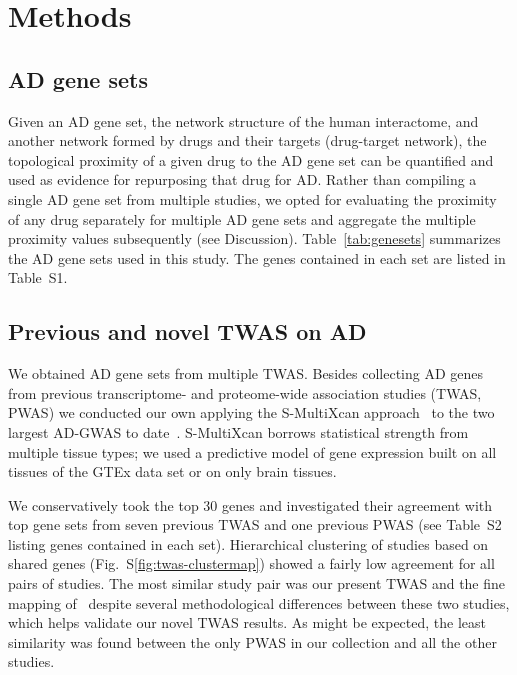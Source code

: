 \documentclass[letterpaper]{article}
\begin{document}
\section{Methods}

\subsection{AD gene sets}

Given an AD gene set, the network structure of the human interactome, and
another network formed by drugs and their targets (drug-target network), the
topological proximity of a given drug to the AD gene set can be
quantified\citep{Guney2016} and used as evidence for repurposing that drug for
AD.  Rather than compiling a single AD gene set from multiple studies, we
opted for evaluating the proximity of any drug separately for multiple AD gene
sets and aggregate the multiple proximity values subsequently (see
Discussion).  Table~\ref{tab:genesets} summarizes the AD gene sets used in
this study.  The genes contained in each set are listed in Table~S1.

\subsection{Previous and novel TWAS on AD}

We obtained AD gene sets from multiple TWAS.  Besides collecting
AD genes from previous transcriptome- and proteome-wide association studies
(TWAS, PWAS) we
conducted our own applying the S-MultiXcan approach~\citep{Barbeira2018} to
the two largest AD-GWAS to date~\citep{Schwartzentruber2021,Wightman2021}.
S-MultiXcan borrows statistical strength from multiple tissue types; we used a
predictive model of gene expression built on all tissues of the GTEx data set
or on only brain tissues.

We conservatively took the top 30 genes and investigated their agreement with
top gene sets from seven previous TWAS and one previous PWAS (see Table~S2
listing genes contained in each set).  Hierarchical clustering of studies
based on shared genes (Fig.~S\ref{fig:twas-clustermap}) showed a fairly low
agreement for all pairs of studies.  The most similar study pair was our
present TWAS and the fine mapping of~\cite{Jansen2019} despite several
methodological differences between these two studies, which helps validate our
novel TWAS results.  As might be expected, the least similarity was found
between the only PWAS in our collection and all the other studies.
\end{document}
